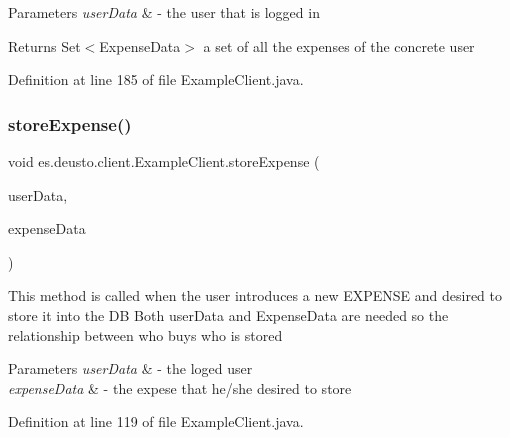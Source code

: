 \begin{DoxyParams}{Parameters}
{\em user\+Data} & -\/ the user that is logged in \\
\hline
\end{DoxyParams}
\begin{DoxyReturn}{Returns}
Set$<$\+Expense\+Data$>$ a set of all the expenses of the concrete user 
\end{DoxyReturn}


Definition at line 185 of file Example\+Client.\+java.

\mbox{\label{classes_1_1deusto_1_1client_1_1_example_client_aba5fe3dfb882ef22d0bd49b5915871d3}} 
\subsubsection{\texorpdfstring{store\+Expense()}{storeExpense()}}
{\footnotesize\ttfamily void es.\+deusto.\+client.\+Example\+Client.\+store\+Expense (\begin{DoxyParamCaption}\item[{\hyperlink{classes_1_1deusto_1_1serialization_1_1_user_data}{User\+Data}}]{user\+Data,  }\item[{\hyperlink{classes_1_1deusto_1_1serialization_1_1_expense_data}{Expense\+Data}}]{expense\+Data }\end{DoxyParamCaption})}

This method is called when the user introduces a new E\+X\+P\+E\+N\+SE and desired to store it into the DB Both user\+Data and Expense\+Data are needed so the relationship between who buys who is stored 
\begin{DoxyParams}{Parameters}
{\em user\+Data} & -\/ the loged user \\
\hline
{\em expense\+Data} & -\/ the expese that he/she desired to store \\
\hline
\end{DoxyParams}


Definition at line 119 of file Example\+Client.\+java.

\mbox{\label{classes_1_1deusto_1_1client_1_1_example_client_a740fa7000d0cd30603ce100b299ba8ba}} 
